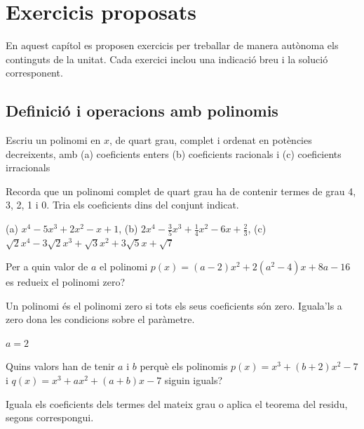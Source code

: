 \chapter{Exercicis proposats}
\label{cap:exercicis-proposats}

En aquest capítol es proposen exercicis per treballar de manera autònoma els continguts de la unitat. Cada exercici inclou una indicació breu i la solució corresponent.

\section{Definició i operacions amb polinomis}

\begin{exercici}
Escriu un polinomi en $x$, de quart grau, complet i ordenat en
potències decreixents, amb (a) coeficients enters (b) coeficients
racionals i (c) coeficients irracionals
\end{exercici}
\begin{indicacio}
Recorda que un polinomi complet de quart grau ha de contenir termes de grau 4, 3, 2, 1 i 0. Tria els coeficients dins del conjunt indicat.
\end{indicacio}

\begin{solucio}
(a) $x^{4}-5x^{3}+2x^{2}-x+1$, (b) $2x^{4}-\frac{3}{5}x^{3}+
\frac{1}{4}x^{2}-6x+\frac{2}{3}$, (c) $\sqrt{2}x^{4}-3\sqrt{2}x^{3}+\sqrt{3}
x^{2}+3\sqrt{5}x+\sqrt{7}$
\end{solucio}

\begin{exercici}
Per a quin valor de $a$ el polinomi $
p(x)=(a-2)x^{2}+2(a^{2}-4)x+8a-16$ es redueix el polinomi zero?
\end{exercici}
\begin{indicacio}
Un polinomi és el polinomi zero si tots els seus coeficients són zero. Iguala’ls a zero dona les condicions sobre el paràmetre.
\end{indicacio}

\begin{solucio}
$a=2$
\end{solucio}

\begin{exercici}
Quins valors han de tenir $a$ i $b$ perquè els
polinomis $p(x)=x^{3}+(b+2)x^{2}-7$ i $q(x)=x^{3}+ax^{2}+(a+b)x-7$ siguin
iguals?
\end{exercici}
\begin{indicacio}
Iguala els coeficients dels termes del mateix grau o aplica el teorema del residu, segons correspongui.
\end{indicacio}

